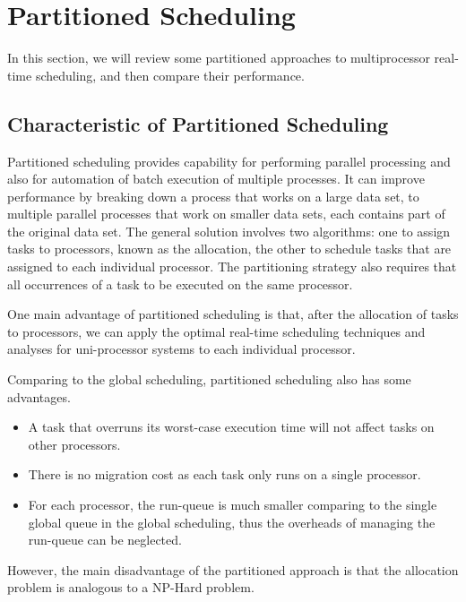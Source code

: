 \documentclass[preprint,12pt]{elsarticle}
\begin{document}
\section{Partitioned Scheduling} \label{S:3}
In this section, we will review some partitioned approaches to multiprocessor real-time scheduling, and then compare their performance.
\subsection{Characteristic of Partitioned Scheduling}
Partitioned scheduling provides capability for performing parallel processing and also for automation of batch execution of multiple processes. It can improve performance by breaking down a process that works on a large data set, to multiple parallel processes that work on smaller data sets, each contains part of the original data set. The general solution involves two algorithms: one to assign tasks to processors, known as the allocation, the other to schedule tasks that are assigned to each individual processor. The partitioning strategy also requires that all occurrences of a task to be executed on the same processor.

One main advantage of partitioned scheduling is that, after the allocation of tasks to processors, we can apply the optimal real-time scheduling techniques and analyses for uni-processor systems to each individual processor. 

Comparing to the global scheduling, partitioned scheduling also has some advantages. 
\begin{itemize}
\item A task that overruns its worst-case execution time will not affect tasks on other processors.
\item There is no migration cost as each task only runs on a single processor.
\item For each processor, the run-queue is much smaller comparing to the single global queue in the global scheduling, thus the overheads of managing the run-queue can be neglected. 
\end{itemize}

However, the main disadvantage of the partitioned approach is that the allocation problem is analogous to a NP-Hard problem. 
\end{document}
